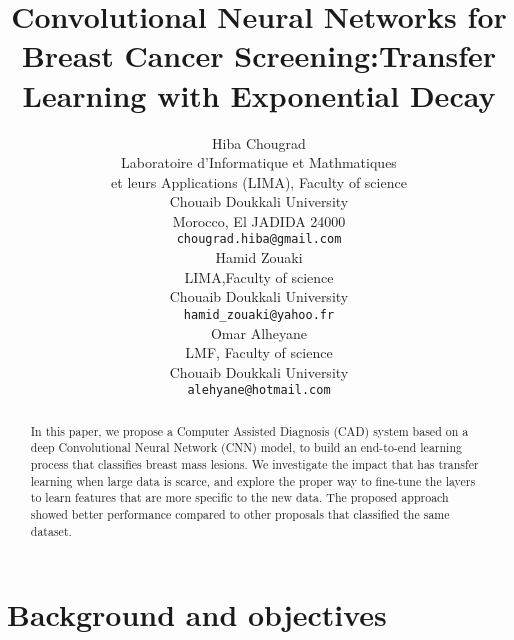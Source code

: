 \documentclass{article}
\title{Convolutional Neural Networks for Breast Cancer Screening:Transfer Learning with Exponential Decay}
\author{
  Hiba Chougrad \\
    Laboratoire d'Informatique et Mathmatiques\\ et leurs Applications (LIMA), Faculty of science\\
  Chouaib Doukkali University\\
  Morocco, El JADIDA 24000 \\
  \texttt{chougrad.hiba@gmail.com} \\
   \And
   Hamid Zouaki \\
   LIMA,Faculty of science  \\
   Chouaib Doukkali University\\
   \texttt{hamid\_zouaki@yahoo.fr} \\
   \AND
   Omar Alheyane \\
   LMF, Faculty of science \\
   Chouaib Doukkali University\\
   \texttt{alehyane@hotmail.com} \\
}
\begin{document}

\maketitle

\begin{abstract}
In this paper, we propose a Computer Assisted Diagnosis (CAD) system based on a deep Convolutional Neural Network (CNN) model, to build an end-to-end learning process that classifies breast mass lesions. We investigate the impact that has transfer learning when large data is scarce, and explore the proper way to fine-tune the layers to learn features that are more specific to the new data. The proposed approach showed better performance compared to other proposals that classified the same dataset.
\end{abstract}

\section{Background and objectives}
\end{document}
